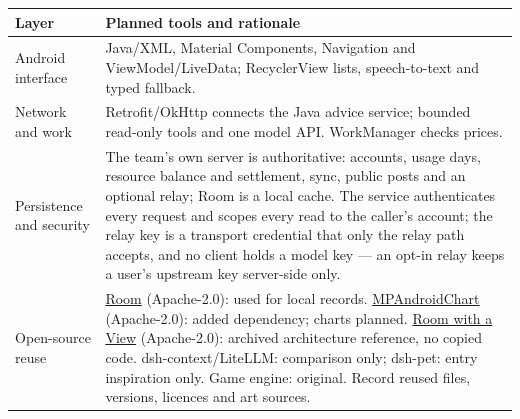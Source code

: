 \documentclass[11pt,a4paper]{article}
\newcommand{\sect}[1]{\vspace{3pt}{\large\bfseries#1}\par\vspace{1pt}}
\begin{document}
\sect{8. Technology and responsible reuse}
\begin{tabularx}{\linewidth}{@{}>{\raggedright\arraybackslash}p{33mm}Y@{}}
\toprule
{}
\textbf{Layer} & \textbf{Planned tools and rationale} \\
\midrule
Android interface & Java/XML, Material Components, Navigation and ViewModel/LiveData; RecyclerView lists, speech-to-text and typed fallback. \\
Network and work & Retrofit/OkHttp connects the Java advice service; bounded read-only tools and one model API. WorkManager checks prices. \\
Persistence and security & The team's own server is authoritative: accounts, usage days, resource balance and settlement, sync, public posts and an optional relay; Room is a local cache. The service authenticates every request and scopes every read to the caller's account; the relay key is a transport credential that only the relay path accepts, and no client holds a model key --- an opt-in relay keeps a user's upstream key server-side only. \\
Open-source reuse & \href{https://github.com/androidx/androidx/blob/androidx-main/LICENSE.txt}{Room} (Apache-2.0): used for local records. \href{https://github.com/PhilJay/MPAndroidChart}{MPAndroidChart} (Apache-2.0): added dependency; charts planned. \href{https://github.com/android/codelab-android-room-with-a-view}{Room with a View} (Apache-2.0): archived architecture reference, no copied code. dsh-context/LiteLLM: comparison only; dsh-pet: entry inspiration only. Game engine: original. Record reused files, versions, licences and art sources. \\
\bottomrule
\end{tabularx}
\end{document}
